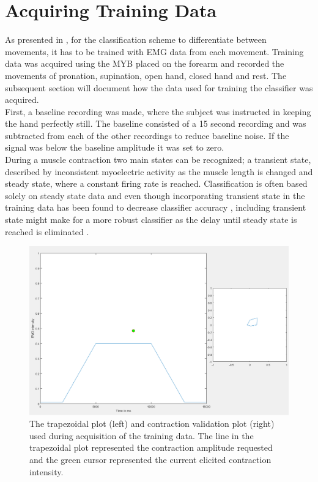 
\section{Acquiring Training Data}

As presented in , for the classification scheme to differentiate between movements, it has to be trained with EMG data from each movement. Training data was acquired using the MYB placed on the forearm and recorded the movements of pronation, supination, open hand, closed hand and rest. The subsequent section will document how the data used for training the classifier was acquired. \\
First, a baseline recording was made, where the subject was instructed in keeping the hand perfectly still. The baseline consisted of a 15 second recording and was subtracted from each of the other recordings to reduce baseline noise. If the signal was below the baseline amplitude it was set to zero. \\
During a muscle contraction two main states can be recognized; a transient state, described by inconsistent myoelectric activity as the muscle length is changed and steady state, where a constant firing rate is reached. \cite{Mobarak2014} Classification is often based solely on steady state data and even though incorporating transient state in the training data has been found to decrease classifier accuracy \cite{Mobarak2014}, including transient state might make for a more robust classifier as the delay until steady state is reached is eliminated \cite{Boschmann2013,Mobarak2014a}. \\
%

\begin{figure}[H]                 
	\includegraphics[width=.8\textwidth]{figures/dataacqGUI}  
	\caption{The trapezoidal plot (left) and contraction validation plot (right) used during acquisition of the training data. The line in the trapezoidal plot represented the contraction amplitude requested and the green cursor represented the current elicited contraction intensity. }
	\label{fig:GUI} 
\end{figure}
\vspace{-1em}

